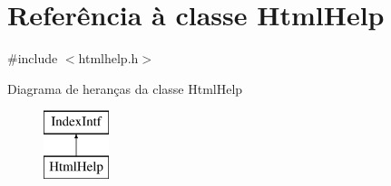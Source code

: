 \hypertarget{class_html_help}{\section{Referência à classe Html\-Help}
\label{class_html_help}
}


{\ttfamily \#include $<$htmlhelp.\-h$>$}

Diagrama de heranças da classe Html\-Help\begin{figure}[H]
\begin{center}
\leavevmode
\includegraphics[height=2.000000cm]{class_html_help}
\end{center}
\end{figure}
